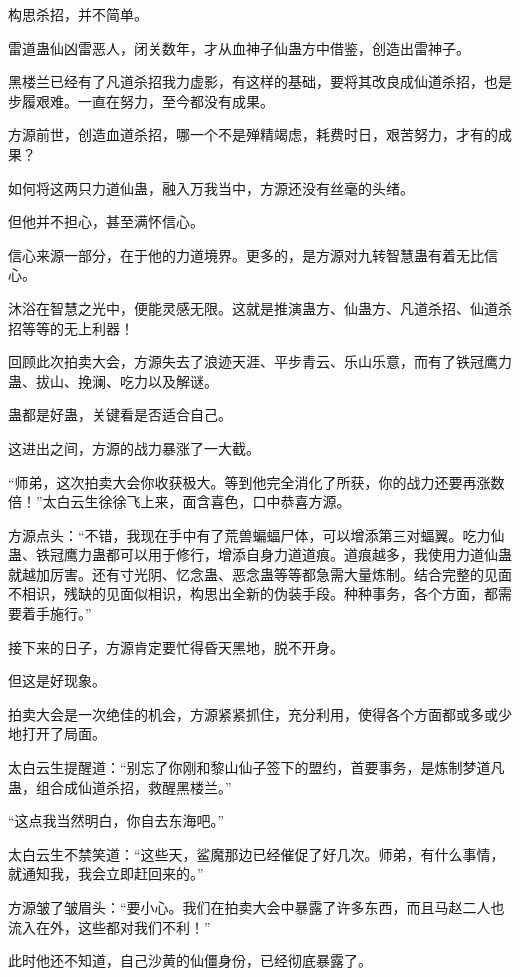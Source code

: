 \begin{this_body}
构思杀招，并不简单。

雷道蛊仙凶雷恶人，闭关数年，才从血神子仙蛊方中借鉴，创造出雷神子。

黑楼兰已经有了凡道杀招我力虚影，有这样的基础，要将其改良成仙道杀招，也是步履艰难。一直在努力，至今都没有成果。

方源前世，创造血道杀招，哪一个不是殚精竭虑，耗费时日，艰苦努力，才有的成果？

如何将这两只力道仙蛊，融入万我当中，方源还没有丝毫的头绪。

但他并不担心，甚至满怀信心。

信心来源一部分，在于他的力道境界。更多的，是方源对九转智慧蛊有着无比信心。

沐浴在智慧之光中，便能灵感无限。这就是推演蛊方、仙蛊方、凡道杀招、仙道杀招等等的无上利器！

回顾此次拍卖大会，方源失去了浪迹天涯、平步青云、乐山乐意，而有了铁冠鹰力蛊、拔山、挽澜、吃力以及解谜。

蛊都是好蛊，关键看是否适合自己。

这进出之间，方源的战力暴涨了一大截。

“师弟，这次拍卖大会你收获极大。等到他完全消化了所获，你的战力还要再涨数倍！”太白云生徐徐飞上来，面含喜色，口中恭喜方源。

方源点头：“不错，我现在手中有了荒兽蝙蝠尸体，可以增添第三对蝠翼。吃力仙蛊、铁冠鹰力蛊都可以用于修行，增添自身力道道痕。道痕越多，我使用力道仙蛊就越加厉害。还有寸光阴、忆念蛊、恶念蛊等等都急需大量炼制。结合完整的见面不相识，残缺的见面似相识，构思出全新的伪装手段。种种事务，各个方面，都需要着手施行。”

接下来的日子，方源肯定要忙得昏天黑地，脱不开身。

但这是好现象。

拍卖大会是一次绝佳的机会，方源紧紧抓住，充分利用，使得各个方面都或多或少地打开了局面。

太白云生提醒道：“别忘了你刚和黎山仙子签下的盟约，首要事务，是炼制梦道凡蛊，组合成仙道杀招，救醒黑楼兰。”

“这点我当然明白，你自去东海吧。”

太白云生不禁笑道：“这些天，鲨魔那边已经催促了好几次。师弟，有什么事情，就通知我，我会立即赶回来的。”

方源皱了皱眉头：“要小心。我们在拍卖大会中暴露了许多东西，而且马赵二人也流入在外，这些都对我们不利！”

此时他还不知道，自己沙黄的仙僵身份，已经彻底暴露了。

\end{this_body}

